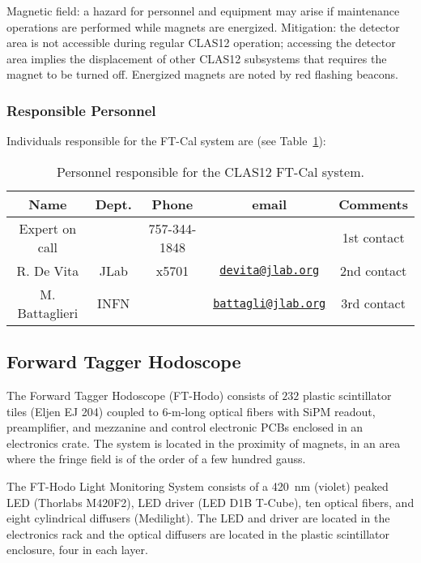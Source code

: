 Magnetic field: a hazard for personnel and equipment may arise if maintenance operations are 
performed while magnets are energized. Mitigation: the detector area is not accessible during 
regular CLAS12 operation; accessing the detector area implies the displacement of other CLAS12 
subsystems that requires the magnet to be turned off. Energized magnets are noted by red flashing 
beacons.

\vfil
\eject

\subsubsection{Responsible Personnel}

Individuals responsible for the FT-Cal system are (see Table~\ref{tb:ft-cal}):

\begin{table}[!htb]
\centering
\begin{tabular}{|c|c|c|c|c|} \hline
Name&Dept.&Phone&email&Comments \\ \hline
Expert on call&      & 757-344-1848 && 1st contact \\ \hline
R. De Vita    & JLab &x5701&\href{mailto:devita@jlab.org}{\nolinkurl{devita@jlab.org}}& 2nd contact  \\ \hline
M. Battaglieri& INFN & &\href{mailto:battagli@jlab.org}{\nolinkurl{battagli@jlab.org}}&3rd contact \\ \hline
\end{tabular}
\caption{Personnel responsible for the CLAS12 FT-Cal system.} 
\label{tb:ft-cal}
\end{table}

\subsection{Forward Tagger Hodoscope}

The Forward Tagger Hodoscope (FT-Hodo) consists of $232$ plastic scintillator tiles (Eljen 
EJ 204) coupled to 6-m-long optical fibers with SiPM readout, preamplifier, and mezzanine 
and control electronic PCBs enclosed in an electronics crate. The system is located in the 
proximity of magnets, in an area where the fringe field is of the order of a few hundred gauss.

The FT-Hodo Light Monitoring System consists of a 420~nm (violet) peaked LED (Thorlabs M420F2), 
LED driver (LED D1B T-Cube), ten optical fibers, and eight cylindrical diffusers (Medilight). 
The LED and driver are located in the electronics rack and the optical diffusers are located 
in the plastic scintillator enclosure, four in each layer.

